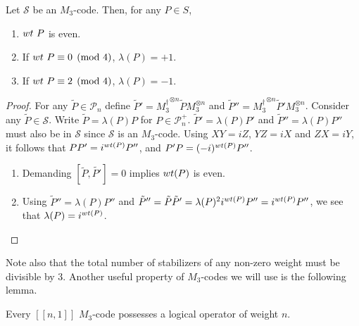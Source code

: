 \documentclass[11pt]{article}
\newcommand{\wt}{{\rm{wt}} }
\begin{document}
\begin{theorem}
\label{thm:ralls-rule}Let $\mathcal S$ be an $M_3$-code. Then, for any $P \in S$,
\begin{enumerate}
\item ${\rm wt}~P$ is even.
\item If ${\rm wt }~P \equiv 0 \pmod 4$, $\lambda(P)=+1$.
\item If ${\rm wt }~P \equiv 2 \pmod 4$, $\lambda(P)=-1$.
\end{enumerate}
\end{theorem}
\begin{proof} 
For any $\tilde{P}\in \mathcal P_n$ define $\tilde{P}'={M_{3}^{\dagger}}^{\otimes n}\tilde{P}M_{3}^{\otimes n}$ and $\tilde{P}''={M_{3}^{\dagger}}^{\otimes n}\tilde{P}'M_{3}^{\otimes n}$. Consider any $\tilde{P}\in \mathcal S$. Write $\tilde{P}=\lambda(P)P$ for $P \in \mathcal P_n^+$. $\tilde{P}'=\lambda(P)P'$ and $\tilde{P}''=\lambda(P)P''$ must also be in $\mathcal S$ since $\mathcal S$ is an $M_3$-code. Using $XY=iZ$, $YZ=iX$ and $ZX=iY$, it follows that $PP'=i^{\wt(P)}P''$, and $P'P=(-i)^{\wt(P)}P''$.
\begin{enumerate}
    \item  Demanding $[\tilde{P},\tilde{P'}]=0$ implies $\wt(P)$ is even.
    \item Using $\tilde{P}''= \lambda(P)P''$ and $\tilde{P}''=\tilde{P} \tilde{P}'=\lambda(P)^2i^{\wt(P)} P''=i^{\wt(P)} P''$, we see that $\lambda(P)=i^{\wt(P)}$.
\end{enumerate}
\end{proof}
Note also that the total number of stabilizers of any non-zero weight must be divisible by 3. Another useful property of $M_3$-codes we will use is the following lemma. 
\begin{lemma}
\label{logical-operator-weight-n-lemma}
Every $[[n,1]]$ $M_3$-code possesses a logical operator of weight $n$.
\end{lemma}
\end{document}
